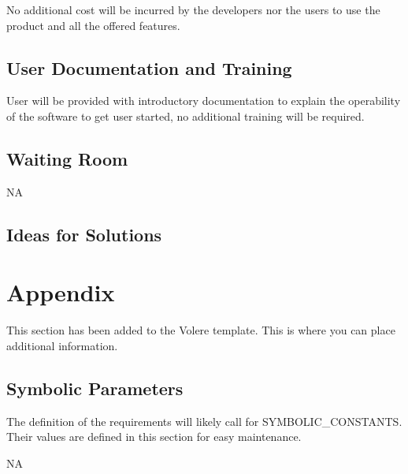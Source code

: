 \documentclass[12pt, titlepage]{article}
\begin{document}
No additional cost will be incurred by the developers nor the users to use the product and all the offered features. 

\subsection{User Documentation and Training}

User will be provided with introductory documentation to explain the operability of the software to get user started, no additional training will be required. 

\subsection{Waiting Room}

NA

\subsection{Ideas for Solutions}





\newpage

\section{Appendix}

This section has been added to the Volere template.  This is where you can place
additional information.

\subsection{Symbolic Parameters}

The definition of the requirements will likely call for SYMBOLIC\_CONSTANTS.
Their values are defined in this section for easy maintenance.

NA 
\end{document}
